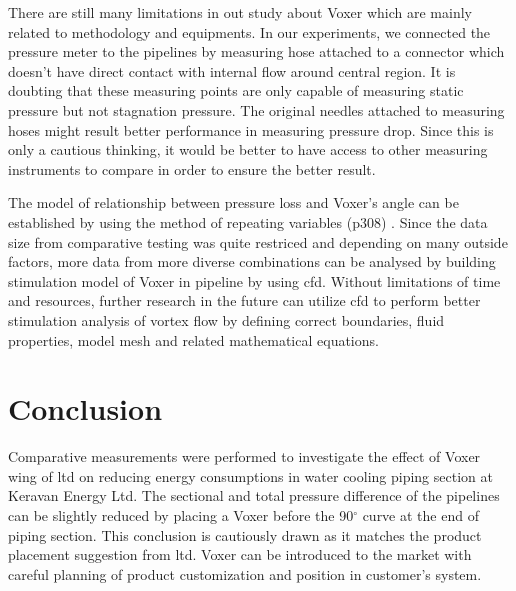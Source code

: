 There are still many limitations in out study about Voxer which are mainly related to methodology and equipments. In our experiments, we connected the pressure meter to the pipelines by measuring hose attached to a connector which doesn't have direct contact with internal flow around central region. It is doubting that these measuring points are only capable of measuring static pressure but not stagnation pressure. The original needles \cite{danfoss:web} attached to measuring hoses might result better performance in measuring pressure drop. Since this is only a cautious thinking, it would be better to have access to other measuring instruments to compare in order to ensure the better result. 

The model of relationship between pressure loss and Voxer's angle can be established by using the method of repeating variables (p308) \cite{cengel:book}. Since the data size from comparative testing was quite restriced and depending on many outside factors, more data from more diverse combinations can be analysed by building stimulation model of Voxer in pipeline by using \gls{cfd}. Without limitations of time and resources, further research in the future can utilize \gls{cfd} to perform better stimulation analysis of vortex flow by defining correct boundaries, fluid properties, model mesh and related mathematical equations. 

\section{Conclusion}

Comparative measurements were performed to investigate the effect of Voxer wing of \gls{ltd} on reducing energy consumptions in water cooling piping section at Keravan Energy Ltd. The sectional and total pressure difference of the pipelines can be slightly reduced by placing a Voxer before the 90$^{\circ}$ curve at the end of piping section. This conclusion is cautiously drawn as it matches the product placement suggestion from \gls{ltd}.  Voxer can be introduced to the market with careful planning of product customization and position in customer's system. 

\clearpage %

